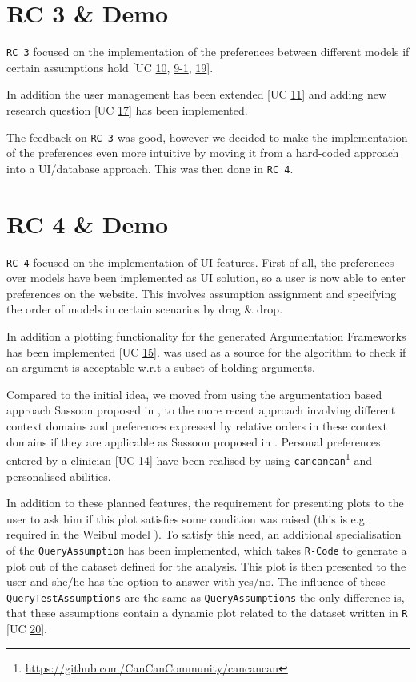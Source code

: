 \documentclass[11pt,twocolumn]{article}
\begin{document}
\section{ RC 3 \& Demo}
\texttt{RC 3} focused on the implementation of the preferences between different models if certain assumptions hold [UC \href{https://trello.com/c/1s656fA9}{10}, \href{https://trello.com/c/Ca9mA3uA}{9-1}, \href{https://trello.com/c/bZHdWpkt}{19}]. 

In addition the user management has been extended [UC \href{https://trello.com/c/xUDStSOK}{11}] and adding new research question [UC \href{https://trello.com/c/Hv2xe2UW}{17}] has been implemented.

The feedback on \texttt{RC 3} was good, however we decided to make the implementation of the preferences even more intuitive by moving it from a hard-coded approach into a UI/database approach. This was then done in \texttt{RC 4}.
\section{ RC 4 \& Demo}
\texttt{RC 4} focused on the implementation of UI features. First of all, the preferences over models have been implemented as UI solution, so a user is now able to enter preferences on the website. This involves assumption assignment and specifying the order of models in certain scenarios by drag \& drop.

In addition a plotting functionality for the generated Argumentation Frameworks has been implemented [UC \href{https://trello.com/c/BOUu2hKN}{15}]. \cite{Dunne10computationin} was used as a source for the algorithm to check if an argument is acceptable w.r.t a subset of holding arguments.

Compared to the initial idea, we moved from using the argumentation based approach Sassoon proposed in \cite{sassoon2014}, to the more recent approach involving different context domains and preferences expressed by relative orders in these context domains if they are applicable as Sassoon proposed in \cite{sassoon2016CD}. Personal preferences entered by a clinician [UC \href{https://trello.com/c/NcV3lo4w}{14}] have been realised by using \texttt{cancancan}\footnote{\href{https://github.com/CanCanCommunity/cancancan}{https://github.com/CanCanCommunity/cancancan}} and personalised abilities. 

In addition to these planned features, the requirement for presenting plots to the user to ask him if this plot satisfies some condition was raised (this is e.g. required in the Weibul model \cite{sassoon2016CD}). To satisfy this need, an additional specialisation of the \texttt{QueryAssumption} has been implemented, which takes \texttt{R-Code} to generate a plot out of the dataset defined for the analysis. This plot is then presented to the user and she/he has the option to answer with yes/no. The influence of these \texttt{QueryTestAssumptions} are the same as \texttt{QueryAssumptions} the only difference is, that these assumptions contain a dynamic plot related to the dataset written in \texttt{R} [UC \href{https://trello.com/c/VThxB5aS}{20}].
\end{document}
